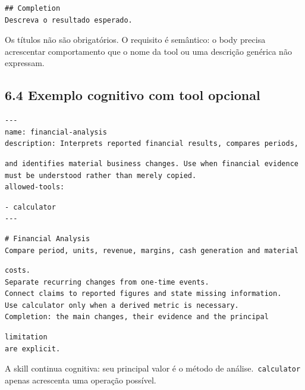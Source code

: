 \documentclass[12pt,a4paper]{article}
\begin{document}
\begin{Verbatim}[breaklines=true,breakanywhere=true,fontsize=\small]
## Completion
Descreva o resultado esperado.
\end{Verbatim}

Os títulos não são obrigatórios. O requisito é semântico: o body precisa acrescentar comportamento que o nome da tool ou uma descrição genérica não expressam.


\subsection*{6.4 Exemplo cognitivo com tool opcional}

\begin{Verbatim}[breaklines=true,breakanywhere=true,fontsize=\small]
---
name: financial-analysis
description: Interprets reported financial results, compares periods,
\end{Verbatim}

\begin{Verbatim}[breaklines=true,breakanywhere=true,fontsize=\small]
and identifies material business changes. Use when financial evidence
must be understood rather than merely copied.
allowed-tools:
\end{Verbatim}

\begin{Verbatim}[breaklines=true,breakanywhere=true,fontsize=\small]
- calculator
---
\end{Verbatim}

\begin{Verbatim}[breaklines=true,breakanywhere=true,fontsize=\small]
# Financial Analysis
Compare period, units, revenue, margins, cash generation and material
\end{Verbatim}

\begin{Verbatim}[breaklines=true,breakanywhere=true,fontsize=\small]
costs.
Separate recurring changes from one-time events.
Connect claims to reported figures and state missing information.
Use calculator only when a derived metric is necessary.
Completion: the main changes, their evidence and the principal
\end{Verbatim}

\begin{Verbatim}[breaklines=true,breakanywhere=true,fontsize=\small]
limitation
are explicit.
\end{Verbatim}

A skill continua cognitiva: seu principal valor é o método de análise.\texttt{ calculator} apenas acrescenta uma operação possível.
\end{document}
